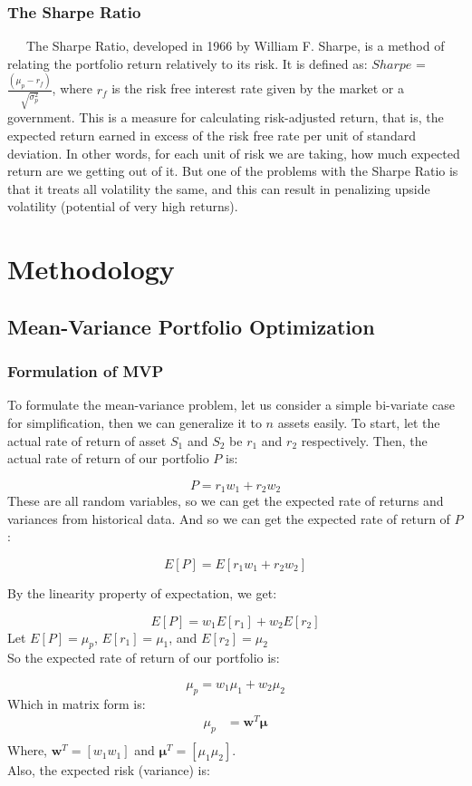 \documentclass[12pt,titlepage,a4paper]{article}
\begin{document}
\subsubsection{The Sharpe Ratio}
\ \ \  The Sharpe Ratio, developed in 1966 by William F. Sharpe, is a method of relating the portfolio return relatively to its risk. It is defined as: $Sharpe$ = $\frac{(\mu_p - r_f)}{\sqrt{\sigma_p^2}}$, where $r_f$ is the risk free interest rate given by the market or a government.  This is a measure for calculating risk-adjusted return, that is, the expected return earned in excess of the risk free rate per unit of standard deviation. In other words, for each unit of risk we are taking, how much expected return are we getting out of it. But one of the problems with the Sharpe Ratio is that it treats all volatility the same, and this can result in penalizing upside volatility (potential of very high returns).\\

\section{Methodology}
\subsection{Mean-Variance Portfolio Optimization}
\subsubsection{Formulation of MVP}

To formulate the mean-variance problem, let us consider a simple bi-variate case for simplification, then we can generalize it to $n$ assets easily. To start, let the actual rate of return of asset $S_1$ and $S_2$ be $r_1$ and $r_2$ respectively. Then, the actual rate of return of our portfolio $P$ is:

$$
P = r_1w_1 + r_2w_2
$$
These are all random variables, so we can get the expected rate of returns and variances from historical data. And so we can get the expected rate of return of $P$: 

$$
E[P] = E[r_1w_1 + r_2w_2]
$$

By the linearity property of expectation, we get: 

$$
E[P] = w_1E[r_1] + w_2E[r_2]
$$
Let $E[P] = \mu_p$, $E[r_1] = \mu_1$, and $E[r_2]=\mu_2$ \\
So the expected rate of return of our portfolio is: 

$$
\mu_p = w_1 \mu_1 + w_2 \mu_2
$$
Which in matrix form is:
\begin{align*}
	\mu_p &= \mathbf{w}^T\mathbf{\mu} \\
\end{align*}
Where,  $\mathbf{w}^T = [ w_1 w_1 ]$ and  $\mathbf{\mu}^T = [ \mu_1 \mu_2 ]$. 
\\
Also, the expected risk (variance) is: 
\end{document}
